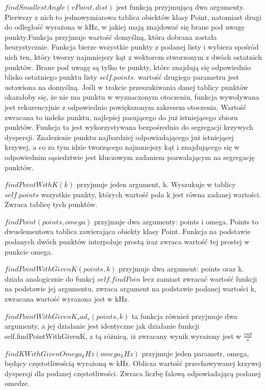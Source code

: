 $findSmallestAngle(vPoint, dist)$ jest funkcją przyjmującą dwa argumenty. Pierwszy z nich to jednowymiarowa tablica obiektów klasy Point, natomiast drugi do odległość wyrażona w kHz, w jakiej mają znajdować się brane pod uwagę punkty.Funkcja przyjmuje wartość domyślną, która dobrana została heurystycznie. Funkcja bierze wszystkie punkty z podanej listy i wybiera spośród nich ten, który tworzy najmniejszy kąt z wektorem stworzonym z dwóch ostatnich punktów. Brane pod uwagę są tylko te punkty, które znajdują się odpowiednio blisko ostatniego punktu listy $self.points$. wartość drugiego parametru jest ustawiona na domyślną. Jeśli w trakcie przeszukiwania danej tablicy punktów okazałoby się, że nie ma punktu w wyznaczonym otoczeniu, funkcja wywoływana jest rekurencyjnie z odpowiednio powiększonym zakresem otoczenia. Wartość zwracana to indeks punktu, najlepiej pasującego do już istniejącego zbioru punktów. Funkcja ta jest wykorzystywana bezpośrednio do segregacji krzywych dyspersji. Znalezienie punktu najbardziej odpowiadającego już istniejącej krzywej, a co za tym idzie tworzącego najmniejszy kąt i znajdującego się w odpowiednim sąsiedztwie jest kluczowym zadaniem pozwalającym na segregację punktów.

$findPointWithK(k)$ przyjmuje jeden argument, k. Wyszukuje w tablicy $self.points$ wszystkie punkty, których wartość pola k jest równa zadanej wartości. Zwraca tablicę tych punktów.

$findPoint(points, omega)$ przyjmuje dwa argumenty: points i omega. Points to dwuelementowa tablica zawierająca obiekty klasy Point. Funkcja na podstawie podanych dwóch punktów interpoluje prostą iraz zwraca wartość tej prostej w punkcie omega.

$findPointWithGivenK(points, k)$ przyjmuje dwa argument: points oraz k. działa analogicznie do funkcj $self.findPoin$ lecz zamiast zwracać wartość funkcji na podstawie jej argumentu, zwraca argument na podstawie podanej wartości k, zwracana wartość wyrazona jest w kHz.

$findPointWithGivenK_rad_s(points, k)$ ta funkcja również przyjmuje dwa argumenty, a jej działanie jest identyczne jak działanie funkcji self.findPointWithGivenK, z tą różnicą, iż zwracany wynik wyrażony jest w $\frac{rad}{s}$

$findKWithGivenOmega_kHz(omega_kHz)$ przyjmuje jeden parametr, omega, będący częstotliwością wyrażoną w kHz. Oblicza wartość przechowywanej krzywej dyspersji dla podanej częstotliwości. Zwraca liczbę falową odpowiadającą podanej omedze.

